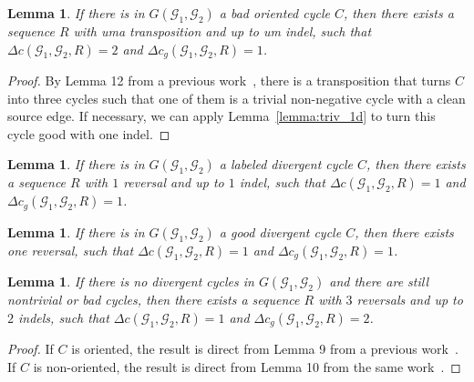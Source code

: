 \documentclass[12pt]{article}
\newtheorem{lemma}[theorem]{Lemma}
\begin{document}
\vspace{8pt}
\begin{lemma}\label{lemma:bad_ori_1t_1d}
If there is in $G(\mathcal{G}_1,\mathcal{G}_2)$ a bad oriented cycle $C$, then there exists a sequence $R$ with uma transposition and up to um indel, such that $\Delta c(\mathcal{G}_1,\mathcal{G}_2,R) = 2$ and $\Delta c_g(\mathcal{G}_1,\mathcal{G}_2,R) = 1$.
\end{lemma}

\begin{proof}
By Lemma 12 from a previous work~\cite{2023b-alexandrino-etal}, there is a transposition that turns $C$ into three cycles such that one of them is a trivial non-negative cycle with a clean source edge. If necessary, we can apply Lemma~\ref{lemma:triv_1d} to turn this cycle good with one indel.
\end{proof}

\vspace{8pt}
\begin{lemma}\cite[Lemma 7]{2021b-alexandrino-etal}\label{lemma:bad_div_1r_1d}
If there is in $G(\mathcal{G}_1,\mathcal{G}_2)$ a labeled divergent cycle $C$, then there exists a sequence $R$ with $1$ reversal and up to $1$ indel, such that $\Delta c(\mathcal{G}_1,\mathcal{G}_2,R) = 1$ and $\Delta c_g(\mathcal{G}_1,\mathcal{G}_2,R) = 1$.
\end{lemma}

\vspace{8pt}
\begin{lemma}\cite[Lemma 8]{2021b-alexandrino-etal}\label{lemma:good_div_1r}
If there is in $G(\mathcal{G}_1,\mathcal{G}_2)$ a good divergent cycle $C$, then there exists one reversal, such that $\Delta c(\mathcal{G}_1,\mathcal{G}_2,R) = 1$ and $\Delta c_g(\mathcal{G}_1,\mathcal{G}_2,R) = 1$.
\end{lemma}

\vspace{8pt}
\begin{lemma}\label{lemma:bad_nodiv_3r_2d}
If there is no divergent cycles in $G(\mathcal{G}_1,\mathcal{G}_2)$ and there are still nontrivial or bad cycles, then there exists a sequence $R$ with $3$ reversals and up to $2$ indels, such that $\Delta c(\mathcal{G}_1,\mathcal{G}_2,R) = 1$ and $\Delta c_g(\mathcal{G}_1,\mathcal{G}_2,R) = 2$.
\end{lemma}

\begin{proof}
If $C$ is oriented, the result is direct from Lemma 9 from a previous work~\cite{2022b-alexandrino-etal}. If $C$ is non-oriented, the result is direct from Lemma 10 from the same work~\cite{2022b-alexandrino-etal}.
\end{proof}
\end{document}
